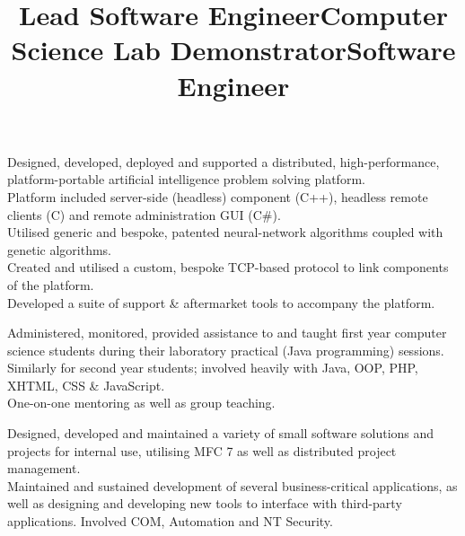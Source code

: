 \documentclass{resume}
\begin{document}
\begin{resume}
\title{\bf Lead Software Engineer}
\begin{position}
Designed, developed, deployed and supported a distributed, high-performance, platform-portable artificial intelligence problem solving platform.\vspace{1mm}\\
Platform included server-side (headless) component (C++), headless remote clients (C) and remote administration GUI (C\#).\vspace{1mm}\\
Utilised generic and bespoke, patented neural-network algorithms coupled with genetic algorithms.\vspace{1mm}\\
Created and utilised a custom, bespoke TCP-based protocol to link components of the platform.\vspace{1mm}\\
Developed a suite of support \& aftermarket tools to accompany the platform.
\end{position}

\title{\bf Computer Science Lab Demonstrator}
\begin{position}
Administered, monitored, provided assistance to and taught first year computer science students during their laboratory practical (Java programming) sessions.\vspace{1mm}\\
Similarly for second year students; involved heavily with Java, OOP, PHP, XHTML, CSS \& JavaScript.\vspace{1mm}\\
One-on-one mentoring as well as group teaching.
\end{position}

\title{\bf Software Engineer}
\begin{position}
Designed, developed and maintained a variety of small software solutions and projects for internal use, utilising MFC 7 as well as distributed project management.\vspace{1mm}\\
Maintained and sustained development of several business-critical applications, as well as designing and developing new tools to interface with third-party applications. Involved COM, Automation and NT Security.
\end{position}


\end{resume}
\end{document}
